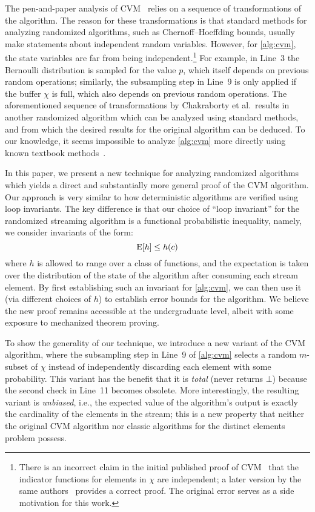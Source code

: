 The pen-and-paper analysis of CVM~\cite{chakraborty2022,chakraborty2023} relies on a sequence of transformations of the algorithm.
The reason for these transformations is that standard methods for analyzing randomized algorithms, such as Chernoff--Hoeffding bounds, usually make statements about independent random variables.
However, for \cref{alg:cvm}, the state variables are far from being independent.\footnote{There is an incorrect claim in the initial published proof of CVM~\cite[Claim 6]{chakraborty2022} that the indicator functions for elements in $\chi$ are independent; a later version by the same authors~\cite{chakraborty2023} provides a correct proof.
The original error serves as a side motivation for this work.}
For example, in Line~3 the Bernoulli distribution is sampled for the value $p$, which itself depends on previous random operations; similarly, the subsampling step in Line~9 is only applied if the buffer $\chi$ is full, which also depends on previous random operations.
The aforementioned sequence of transformations by Chakraborty et al.~results in another randomized algorithm which can be analyzed using standard methods, and from which the desired results for the original algorithm can be deduced.
To our knowledge, it seems impossible to analyze \cref{alg:cvm} more directly using known textbook methods~\cite{alon2000,mitzenmacher2017,motwani1995}.

In this paper, we present a new technique for analyzing randomized algorithms which yields a direct and substantially more general proof of the CVM algorithm.
Our approach is very similar to how deterministic algorithms are verified using loop invariants.
The key difference is that our choice of ``loop invariant'' for the randomized streaming algorithm is a functional probabilistic inequality, namely, we consider invariants of the form:
\[
  \operatorname{\mathrm{E}} [ h ] \leq h(c)
\]
where $h$ is allowed to range over a class of functions, and the expectation is taken over the distribution of the state of the algorithm after consuming each stream element.
By first establishing such an invariant for \cref{alg:cvm}, we can then use it (via different choices of $h$) to establish error bounds for the algorithm.
We believe the new proof remains accessible at the undergraduate level, albeit with some exposure to mechanized theorem proving.

To show the generality of our technique, we introduce a new variant of the CVM algorithm, where the subsampling step in Line~9 of \cref{alg:cvm} selects a random $m$-subset of $\chi$ instead of independently discarding each element with some probability.
This variant has the benefit that it is \emph{total} (never returns $\bot$) because the second check in Line~11 becomes obsolete.
More interestingly, the resulting variant is \emph{unbiased}, i.e., the expected value of the algorithm's output is exactly the cardinality of the elements in the stream; this is a new property that neither the original CVM algorithm nor classic algorithms for the distinct elements problem possess.

